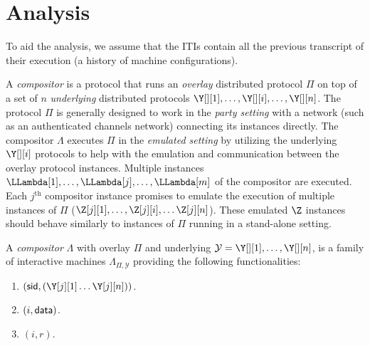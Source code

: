 \section{Analysis}

To aid the analysis, we assume that the ITIs contain all the previous transcript
of their execution (a history of machine configurations).

%


A \emph{compositor} is a protocol that
runs an \emph{overlay} distributed protocol $\Pi$ on top of a set of
$n$ \emph{underlying} distributed protocols $\Y[][1], \ldots, \Y[][i], \ldots, \Y[][n]$.
The protocol $\Pi$ is generally designed
to work in the \emph{party setting} with a network (such as an authenticated channels network)
connecting its instances directly.
The compositor $\Lambda$ executes
$\Pi$ in the \emph{emulated setting} by utilizing the underlying
$\Y[][i]$ protocols to help with the emulation and communication between the
overlay protocol instances.
Multiple instances $\LLambda[1], \ldots, \LLambda[j], \ldots, \LLambda[m]$
of the compositor are executed.
Each $j^\text{th}$ compositor instance promises to emulate the execution of multiple
instances of $\Pi$ ($\Z[j][1], \ldots, \Z[j][i], \ldots \Z[j][n]$).
These emulated $\Z$ instances should behave similarly to instances of $\Pi$
running in a stand-alone setting.

\begin{definition}[Compositor]
  A \emph{compositor} $\Lambda$ with overlay $\Pi$ and underlying $\mathcal{Y} = \Y[][1], \ldots, \Y[][n]$,
  is a family of interactive machines
  $\Lambda_{\Pi,\mathcal{Y}}$ providing the following
  functionalities:

  \begin{enumerate}
    \item \construct$(\sid, (\Y[j][1] \ldots \Y[j][n]))$.
    \item \writeToMachine$(i, \textsf{data})$.
    \item \emulateMachine$(i, r)$. %
  \end{enumerate}
\end{definition}


